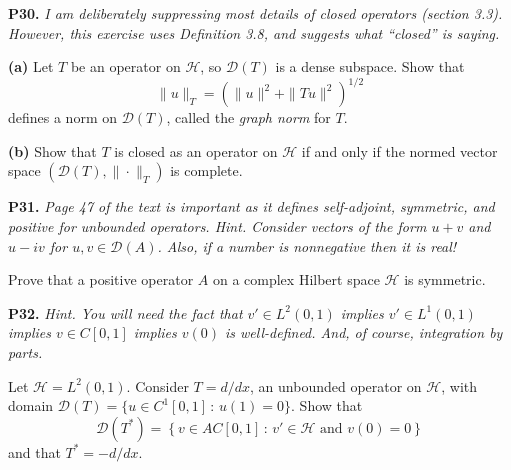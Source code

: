 \documentclass[12pt]{amsart}
\newcommand{\cD}{\mathcal{D}}
\newcommand{\cH}{\mathcal{H}}
\newcommand{\prob}[1]{\bigskip\noindent\textbf{#1.}\quad }
\newcommand{\epart}[1]{\medskip\noindent\textbf{(#1)}\quad }
\begin{document}
\prob{P30} \emph{I am deliberately suppressing most details of \emph{closed} operators (section 3.3).  However, this exercise uses Definition 3.8, and suggests what ``closed'' is saying.}

\epart{a} Let $T$ be an operator on $\cH$, so $\cD(T)$ is a dense subspace.  Show that
	$$\|u\|_T = \left(\|u\|^2 + \|Tu\|^2\right)^{1/2}$$
defines a norm on $\cD(T)$, called the \emph{graph norm} for $T$.

\epart{b} Show that $T$ is closed as an operator on $\cH$ if and only if the normed vector space $(\cD(T),\|\cdot\|_T)$ is complete.


\clearpage\newpage
\prob{P31} \emph{Page 47 of the text is important as it defines \emph{self-adjoint}, \emph{symmetric}, and \emph{positive} for unbounded operators.  Hint. Consider vectors of the form $u+v$ and $u-iv$ for $u,v\in\cD(A)$.  Also, if a number is nonnegative then it is real!}

\medskip\noindent Prove that a positive operator $A$ on a complex Hilbert space $\cH$ is symmetric.


\prob{P32}  \emph{Hint.  You will need the fact that $v' \in L^2(0,1)$ implies $v' \in L^1(0,1)$ implies $v \in C[0,1]$ implies $v(0)$ is well-defined.  And, of course, integration by parts.}

\medskip\noindent Let $\cH=L^2(0,1)$.  Consider $T=d/dx$, an unbounded operator on $\cH$, with domain $\cD(T) = \{u\in C^1[0,1]\,:\,u(1)=0\}$.  Show that
    $$\cD(T^*) = \left\{v\in AC[0,1]\,:\,v'\in\cH \text{ and } v(0)=0\right\}$$
and that $T^*=-d/dx$.
\end{document}
